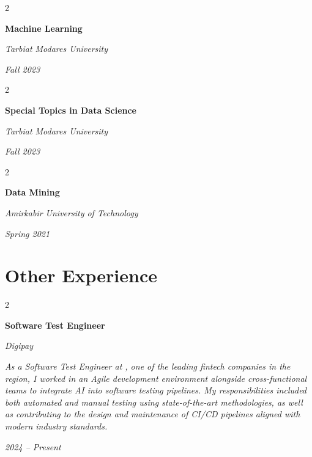 \documentclass[10pt, letterpaper]{article}
\newenvironment{twocolentry}[2][]{
    \onecolentry
    \def\secondColumn{#2}
    \setcolumnwidth{\fill, 4.5 cm}
    \begin{paracol}{2}
}{
    \switchcolumn \raggedleft \secondColumn
    \end{paracol}
    \endonecolentry
} %
\let\hrefWithoutArrow\href
\renewcommand{\href}[2]{\hrefWithoutArrow{#1}{\ifthenelse{\equal{#2}{}}{ }{#2 }\raisebox{.15ex}{\footnotesize \faExternalLink*}}}
\begin{document}
\vspace{1.5mm}

\begin{twocolentry}{
		\textit{Fall 2023}}
	\textbf{Machine Learning}
	
	\textit{Tarbiat Modares University}
	
\end{twocolentry}

\vspace{1.5mm}

\begin{twocolentry}{
		\textit{Fall  2023}}
	\textbf{Special Topics in Data Science}
	
	\textit{Tarbiat Modares University}
	
\end{twocolentry}

\vspace{1.5mm}

\begin{twocolentry}{
		\textit{Spring 2021}}
	\textbf{Data Mining}
	
	\textit{Amirkabir University of Technology}
	
\end{twocolentry}

\vspace{1.5mm}


\section{Other Experience}

\begin{twocolentry}{
		\textit{2024 -- Present}}
	\textbf{Software Test Engineer}
	
	\textit{Digipay}
	
	\vspace{1mm}
	
	\textit{As a Software Test Engineer at \href{https://app.mydigipay.com/hub}{Digipay}, one of the leading fintech companies in the region, I worked in an Agile development environment alongside cross-functional teams to integrate AI into software testing pipelines. My responsibilities included both automated and manual testing using state-of-the-art methodologies, as well as contributing to the design and maintenance of CI/CD pipelines aligned with modern industry standards.}
\end{twocolentry}
\end{document}
